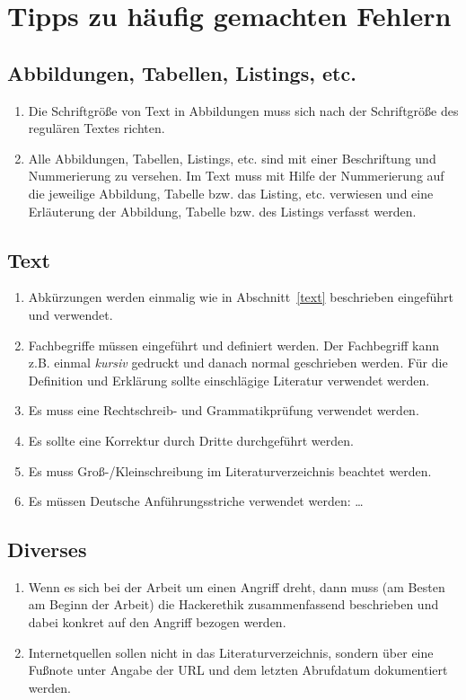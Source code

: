 \section{Tipps zu häufig gemachten Fehlern}

\subsection{Abbildungen, Tabellen, Listings, etc.}
\begin{enumerate}
 \item Die Schriftgröße von Text in Abbildungen muss sich nach der Schriftgröße
 des regulären Textes richten.
 \item Alle Abbildungen, Tabellen, Listings, etc. sind mit einer Beschriftung
 und Nummerierung zu versehen. Im Text muss mit Hilfe der Nummerierung auf
 die jeweilige Abbildung, Tabelle bzw. das Listing, etc. verwiesen und eine
 Erläuterung der Abbildung, Tabelle bzw. des Listings verfasst werden.
\end{enumerate}

\subsection{Text}
\begin{enumerate}
 \item Abkürzungen werden einmalig wie in Abschnitt~\ref{text} beschrieben eingeführt
 und verwendet.
 \item Fachbegriffe müssen eingeführt und definiert werden. Der Fachbegriff kann
 z.B. einmal \textit{kursiv} gedruckt und danach normal geschrieben werden. Für
 die Definition und Erklärung sollte einschlägige Literatur verwendet werden.
 \item Es muss eine Rechtschreib- und Grammatikprüfung verwendet werden.
 \item Es sollte eine Korrektur durch Dritte durchgeführt werden.
 \item Es muss Groß-/Kleinschreibung im Literaturverzeichnis beachtet werden.
 \item Es müssen Deutsche Anführungsstriche verwendet werden: \glqq \dots\grqq
\end{enumerate}

\subsection{Diverses}
\begin{enumerate}
 \item Wenn es sich bei der Arbeit um einen Angriff dreht, dann muss
 (am Besten am Beginn der Arbeit) die Hackerethik zusammenfassend beschrieben
 und dabei konkret auf den Angriff bezogen werden.
 \item Internetquellen sollen nicht in das Literaturverzeichnis, sondern über
 eine Fußnote unter Angabe der URL und dem letzten Abrufdatum dokumentiert
 werden.
\end{enumerate}
